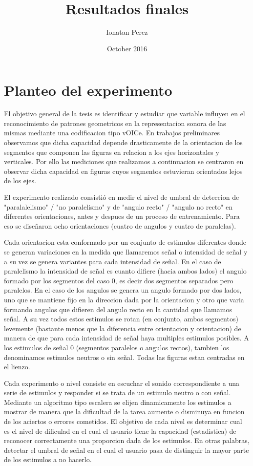 \documentclass{article}
\title{Resultados finales}
\author{Ionatan Perez}
\date{October 2016}
\begin{document}
\maketitle

\section{Planteo del experimento}


El objetivo general de la tesis es identificar y estudiar que variable influyen en el reconocimiento de patrones geometricos en la representacion sonora de las mismas mediante una codificacion tipo vOICe. En trabajos preliminares observamos que dicha capacidad depende drasticamente de la orientacion de los segmentos que componen las figuras en relacion a los ejes horizontales y verticales. Por ello las mediciones que realizamos a continuacion se centraron en observar dicha capacidad en figuras cuyos segmentos estuvieran orientados lejos de los ejes. 

El experimento realizado consistió en medir el nivel de umbral de deteccion de "paralalelismo" / "no paralelismo" y de "angulo recto" / "angulo no recto" en diferentes orientaciones, antes y despues de un proceso de entrenamiento. Para eso se diseñaron ocho orientaciones (cuatro de angulos y cuatro de paralelas).

Cada orientacion esta conformado por un conjunto de estimulos diferentes donde se generan variaciones en la medida que llamaremos señal o intensidad de señal y a su vez se genera variantes para cada intensidad de señal. En el caso de paralelismo la intensidad de señal es cuanto difiere (hacia ambos lados) el angulo formado por los segmentos del caso 0, es decir dos segmentos separados pero paralelos. En el caso de los angulos se genera un angulo formado por dos lados, uno que se mantiene fijo en la direccion dada por la orientacion y otro que varia formando angulos que difieren del angulo recto en la cantidad que llamamos señal. A su vez todos estos estimulos se rotan (en conjunto, ambos segmentos) levemente (bastante menos que la diferencia entre orientacion y orientacion) de manera de que para cada intensidad de señal haya multiples estimulos posibles. A los estimulos de señal 0 (segmentos paralelos o angulos rectos), tambien los denominamos estimulos neutros o sin señal. Todas las figuras estan centradas en el lienzo.

Cada experimento o nivel consiste en escuchar el sonido correspondiente a una serie de estimulos y responder si se trata de un estimulo neutro o con señal. Mediante un algoritmo tipo escalera se elijen dinamicamente los estimulos a mostrar de manera que la dificultad de la tarea aumente o disminuya en funcion de los aciertos o errores cometidos. El objetivo de cada nivel es determinar cual es el nivel de dificulad en el cual el usuario tiene la capacidad (estadistica) de reconocer correctamente una proporcion dada de los estimulos. En otras palabras, detectar el umbral de señal en el cual el usuario pasa de distinguir la mayor parte de los estimulos a no hacerlo. 
\end{document}
